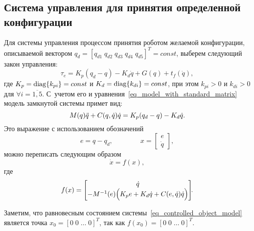 \subsection{Система управления для принятия определенной конфигурации}
Для системы управления процессом принятия роботом желаемой конфигурации, описываемой вектором $q_d = \left[ q_{d1} \; q_{d2} \; q_{d3} \; q_{d4} \; q_{d5} \right]^T = const$, выберем следующий закон управления:
\begin{equation}\label{eq_set_point_control_law}
    \tau_e = K_p (q_d - q) - K_d \dot{q} + G(q) + t_f(\dot{q}),
\end{equation}
где $K_p = \operatorname{diag}\{k_{pi}\} = const$ и $K_d = \operatorname{diag}\{k_{di}\} = const$, при этом $k_{pi}>0$ и $k_{di}>0$ для $\forall i=\overline{1,5}$.
С~учетом его и уравнения~\eqref{eq_model_with_standard_matrix} модель замкнутой системы примет вид:
\begin{equation}
    M(q) \ddot{q} + C(q,\dot{q}) \dot{q} = K_p (q_d - q) - K_d \dot{q}\ldotp
\end{equation}
Это выражение с использованием обозначений
\begin{equation}
    e = q - q_d,
    \qquad \qquad
    x =
    \begin{bmatrix}
        e \\ \dot{q}
    \end{bmatrix}\!\!,
\end{equation}
можно переписать следующим образом
\begin{equation}\label{eq_controlled_object_model}
    \dot{x} = f(x),
\end{equation}
где
\begin{equation}
    f(x) =
    \begin{bmatrix}
        \dot{q} \\
        -M^{-1}(e) \Bigl( K_p e + K_d \dot{q} + C(e,\dot{q}) \dot{q} \Bigr)
    \end{bmatrix}\!\!\ldotp
\end{equation}

Заметим, что равновесным состоянием системы~\eqref{eq_controlled_object_model} является точка \linebreak $x_0 = [0\;0\;\ldots\;0]^T$, так как $f(x_0) = [0\;0\;\ldots\;0]^T$.

